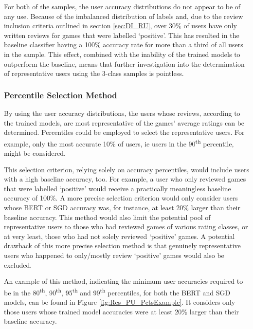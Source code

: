 For both of the samples, the user accuracy distributions do not appear to be of any use. Because of the imbalanced distribution of labels and, due to the review inclusion criteria outlined in section \ref{sec:DI_RU}, over 30\% of users have only written reviews for games that were labelled `positive'. This has resulted in the baseline classifier having a 100\% accuracy rate for more than a third of all users in the sample. This effect, combined with the inability of the trained models to outperform the baseline, means that further investigation into the determination of representative users using the 3-class samples is pointless.

\subsubsection{Percentile Selection Method}

By using the user accuracy distributions, the users whose reviews, according to the trained models, are most representative of the games' average ratings can be determined. Percentiles could be employed to select the representative users. For example, only the most accurate 10\% of users, ie users in the 90\textsuperscript{th} percentile, might be considered.

This selection criterion, relying solely on accuracy percentiles, would include users with a high baseline accuracy, too. For example, a user who only reviewed games that were labelled `positive' would receive a practically meaningless baseline accuracy of 100\%. A more precise selection criterion would only consider users whose BERT or SGD accuracy was, for instance, at least 20\% larger than their baseline accuracy. This method would also limit the potential pool of representative users to those who had reviewed games of various rating classes, or at very least, those who had not solely reviewed `positive' games. A potential drawback of this more precise selection method is that genuinely representative users who happened to only/mostly review `positive' games would also be excluded.

An example of this method, indicating the minimum user accuracies required to be in the 80\textsuperscript{th}, 90\textsuperscript{th}, 95\textsuperscript{th} and 99\textsuperscript{th} percentiles, for both the BERT and SGD models, can be found in Figure \ref{fig:Res_PU_PctsExample}. It considers only those users whose trained model accuracies were at least 20\% larger than their baseline accuracy.

